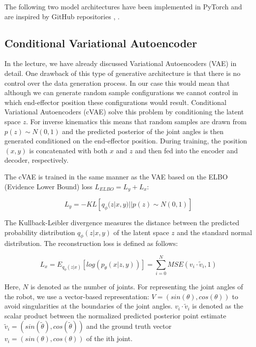 \documentclass[conference]{IEEEtran}
\begin{document}
The following two model architectures have been implemented in PyTorch and are inspired by GitHub repositories \cite{graviraja2019}, \cite{freia2020}.

\subsection*{Conditional Variational Autoencoder}

In the lecture, we have already discussed Variational Autoencoders (VAE) \cite{Kingma2014} in detail. One drawback of this type of generative architecture is that there is no control over the data generation process. In our case this would mean that although we can generate random sample configurations we cannot control in which end-effector position these configurations would result. Conditional Variational Autoencoders (cVAE) \cite{Sohn2015} solve this problem by conditioning the latent space $z$. For inverse kinematics this means that random samples are drawn from $p(z) \sim N(0, 1)$ and the predicted posterior of the joint angles is then generated conditioned on the end-effector position. During training, the position $(x, y)$ is concatenated with both $x$ and $z$ and then fed into the encoder and decoder, respectively.

The cVAE is trained in the same manner as the VAE based on the ELBO (Evidence Lower Bound) loss $L_{ELBO} = L_y + L_x$: 

\begin{equation}
L_y = - KL[q_\phi(z | x, y) || p(z) \sim N(0, 1) ]
\label{ELBO}
\end{equation}

The Kullback-Leibler divergence measures the distance between the predicted probability distribution $q_\phi(z | x, y)$ of the latent space $z$ and the standard normal distribution. The reconstruction loss is defined as follows: 

\begin{equation}
L_x = E_{q_\phi(z | x)}[log(p_\theta(x| z, y))] = \sum _ {i=0} ^ N MSE(v_i \cdot \tilde v_i, 1)
\label{MSE}
\end{equation}

Here, $N$ is denoted as the  number of joints. For representing the joint angles of the robot, we use a vector-based representation: $V = (sin(\theta), cos(\theta))$ to avoid singularities at the boundaries of the joint angles. $v_i \cdot \tilde v_i$ is denoted as the scalar product between the normalized predicted posterior point estimate  $\tilde v_i  = (sin(\tilde \theta), cos(\tilde \theta))$ and the ground truth vector  $v_i = (sin(\theta), cos(\theta))$ of the ith joint.
\end{document}
